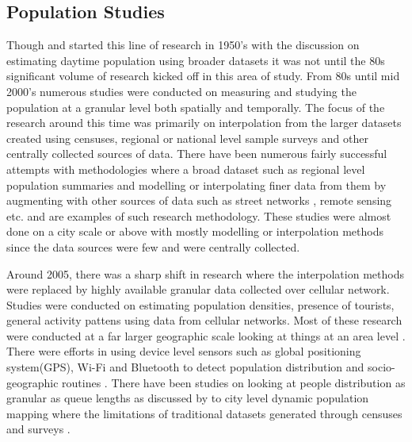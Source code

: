 \subsection{Population Studies}

Though \citet{foley1954} and \citet{schmitt1956} started this line of research in 1950's with the discussion on estimating daytime population using broader datasets it was not until the 80s significant volume of research kicked off in this area of study.
From 80s until mid 2000's numerous studies were conducted on measuring and studying the population at a granular level both spatially and temporally.
The focus of the research around this time was primarily on interpolation from the larger datasets created using censuses, regional or national level sample surveys and other centrally collected sources of data.
There have been numerous fairly successful attempts with methodologies where a broad dataset such  as regional level population summaries and modelling or interpolating finer data from them by augmenting with other sources of data such as street networks \citep{reibel2005}, remote sensing \citep{sutton1997, yuan1997, chen2002} etc.
\citet{dobson2000, dobson2003a, bhaduri2002, bhaduri2007} and \citep{mennis2003, mennis2006} are examples of such research methodology.
These studies were almost done on a city scale or above with mostly modelling or interpolation methods since the data sources were few and were centrally collected.

Around 2005, there was a sharp shift in research where the interpolation methods were replaced by highly available granular data collected over cellular network.
Studies were conducted on estimating population densities, presence of tourists, general activity pattens using data from cellular networks.
Most of these research were conducted at a far larger geographic scale looking at things at an area level \citep{pulselli2008, girardin2009, phithakkitnukoon2010, yuan2016}.
There were efforts in using device level sensors such as global positioning system(GPS), Wi-Fi and Bluetooth to detect population distribution and socio-geographic routines \citep{calabrese2010, rose2010, farrahi2010}.
There have been studies on looking at people distribution as granular as queue lengths as discussed by \citep{wang2013} to city level dynamic population mapping where the limitations of traditional datasets generated through censuses and surveys \cite{deville2014}.

